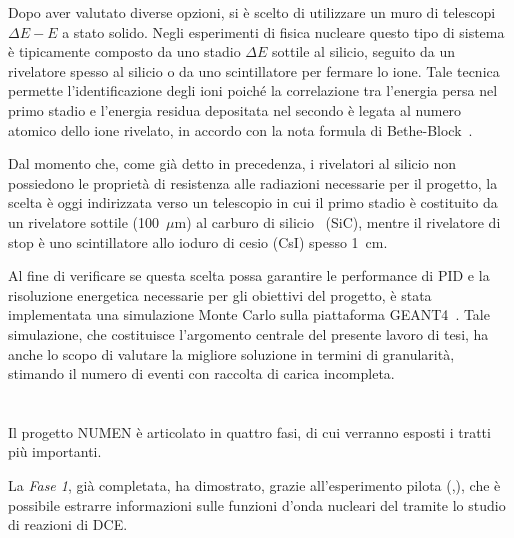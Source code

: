 Dopo aver valutato diverse opzioni, si è scelto di utilizzare un muro di telescopi $ \Delta E - E $ a stato solido.
Negli esperimenti di fisica nucleare questo tipo di sistema è tipicamente composto da uno stadio $\Delta E$ sottile al silicio, seguito da un rivelatore spesso al silicio o da uno scintillatore per fermare lo ione.
Tale tecnica permette l'identificazione degli ioni poiché la correlazione tra l'energia persa nel primo stadio e l'energia residua depositata nel secondo è legata al numero atomico dello ione rivelato, in accordo con la nota formula di Bethe-Block~\cite{knoll:10}.

Dal momento che, come già detto in precedenza, i rivelatori al silicio non possiedono le proprietà di resistenza alle radiazioni necessarie per il progetto, la scelta è oggi indirizzata verso un telescopio in cui il primo stadio è costituito da un rivelatore sottile (100~$\mu $m) al carburo di silicio~\cite{tudisco:sensors18} (SiC), mentre il rivelatore di stop è uno scintillatore allo ioduro di cesio (CsI) spesso 1~cm.

Al fine di verificare se questa scelta possa garantire le performance di PID e la risoluzione energetica necessarie per gli obiettivi del progetto, è stata implementata una simulazione Monte Carlo sulla piattaforma GEANT4~\cite{agostinelli:nima02,allison:nima16,allison:ieeetns06}.
Tale simulazione, che costituisce l'argomento centrale del presente lavoro di tesi, ha anche lo scopo di valutare la migliore soluzione in termini di granularità, stimando il numero di eventi con raccolta di carica incompleta.








\section{}

Il progetto NUMEN è articolato in quattro fasi, di cui verranno esposti i tratti più importanti. 

La \emph{Fase 1}, già completata, ha dimostrato, grazie all'esperimento pilota (,), che è possibile estrarre informazioni sulle funzioni d'onda nucleari del \doppiobeta{} tramite lo studio di reazioni di DCE.

